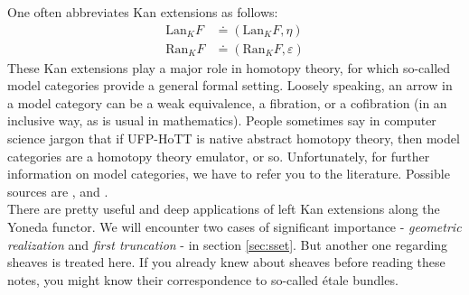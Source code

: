 One often abbreviates Kan extensions as follows:
\begin{align*}
  \mathrm{Lan}_{K}F
  &\doteq
  \left(
    \mathrm{Lan}_{K}F,
    \eta
  \right)
  \\
  \mathrm{Ran}_{K}F
  &\doteq
  \left(
    \mathrm{Ran}_{K}F,
    \varepsilon
  \right)
\end{align*}
These Kan extensions play a major role in homotopy theory, for which so-called {\glqq}model categories{\grqq} provide a general formal setting.
Loosely speaking, an arrow in a model category can be a weak equivalence, a fibration, or a cofibration (in an inclusive way, as is usual in mathematics).
People sometimes say in computer science jargon that if UFP-HoTT is native abstract homotopy theory, then model categories are a homotopy theory emulator, or so.
Unfortunately, for further information on model categories, we have to refer you to the literature.
Possible sources are \cite{791993d6}, \cite{70961a11} and \cite{7a40623d}.
\\
There are pretty useful and deep applications of left Kan extensions along the Yoneda functor.
We will encounter two cases of significant importance - \textit{geometric realization} and \textit{first truncation} - in section \ref{sec:sset}.
But another one regarding sheaves is treated here.
If you already knew about sheaves before reading these notes, you might know their correspondence to so-called {\'e}tale bundles.
\\
